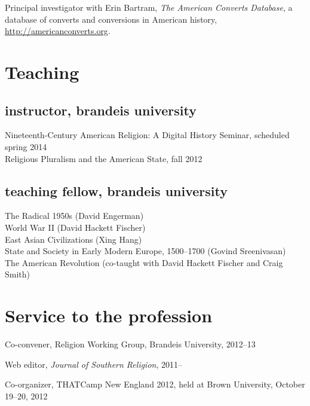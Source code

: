 \documentclass[11pt]{article}
\begin{document}
Principal investigator with Erin Bartram, \emph{The American Converts 
Database}, a database of converts and conversions in American history, 
\href{http://americanconverts.org}{http://americanconverts.org}.

\section{Teaching}

\subsection{instructor, brandeis university}
\noindent
Nineteenth-Century American Religion: A Digital History Seminar, 
scheduled spring 2014\\
Religious Pluralism and the American State, fall 2012

\subsection{teaching fellow, brandeis university}

The Radical 1950s (David Engerman)\\
World War II (David Hackett Fischer)\\
East Asian Civilizations (Xing Hang)\\
State and Society in Early Modern Europe, 1500--1700
(Govind Sreenivasan)\\
The American Revolution (co-taught with David Hackett 
Fischer and Craig Smith)



\section{Service to the profession}

Co-convener, Religion Working Group, Brandeis University, 
2012--13

Web editor, \emph{Journal of Southern Religion}, 2011--

Co-organizer, THATCamp New England 2012, held at Brown University,
October 19--20, 2012
\end{document}
